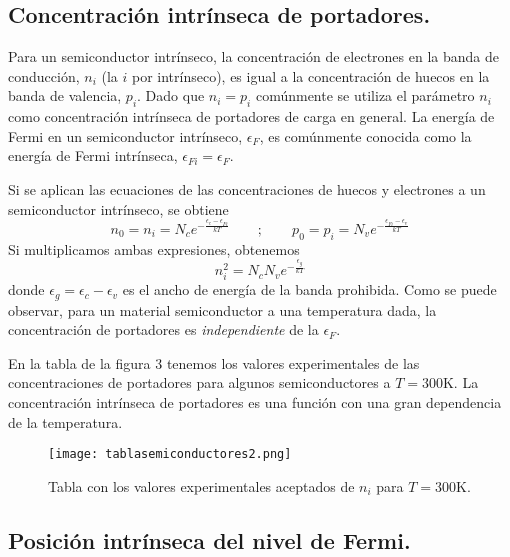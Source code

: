 \documentclass[12pt,a4paper]{article}
\begin{document}
\subsection{Concentración intrínseca de portadores.}

Para un semiconductor intrínseco, la concentración de electrones en la banda de conducción, $n_{i}$ (la $i$ por intrínseco), es igual a la concentración de huecos en la banda de valencia, $p_{i}$. Dado que $n_{i}=p_{i}$ comúnmente se utiliza el parámetro $n_{i}$ como concentración intrínseca de portadores de carga en general. La energía de Fermi en un semiconductor intrínseco, $\epsilon _{F}$, es comúnmente conocida como la energía de Fermi intrínseca, $\epsilon _{Fi} = \epsilon _{F}$.

Si se aplican las ecuaciones de las concentraciones de huecos y electrones a un semiconductor intrínseco, se obtiene
\[ n_{0}=n_{i}= N_{c} e^{-\frac{\epsilon _{c} - \epsilon _{Fi}}{kT}} \qquad ; \qquad p_{0}=p_{i}= N_{v} e^{-\frac{\epsilon _{Fi} - \epsilon _{v}}{kT}} \]
Si multiplicamos ambas expresiones, obtenemos
\[ n_{i}^{2} = N_{c} N_{v} e^{-\frac{\epsilon _{g}}{kT}} \]
donde $\epsilon _{g} = \epsilon _{c} - \epsilon _{v}$ es el ancho de energía de la banda prohibida. Como se puede observar, para un material semiconductor a una temperatura dada, la concentración de portadores es \emph{independiente} de la $\epsilon _{F}$.

En la tabla de la figura 3 tenemos los valores experimentales de las concentraciones de portadores para algunos semiconductores a $T=300$K. La concentración intrínseca de portadores es una función con una gran dependencia de la temperatura.

\begin{figure}[ht!]
\begin{center}
\texttt{[image: tablasemiconductores2.png]}
\caption{Tabla con los valores experimentales aceptados de $n_{i}$ para $T=300$K.}
\end{center}
\end{figure}

\subsection{Posición intrínseca del nivel de Fermi.}
\end{document}
